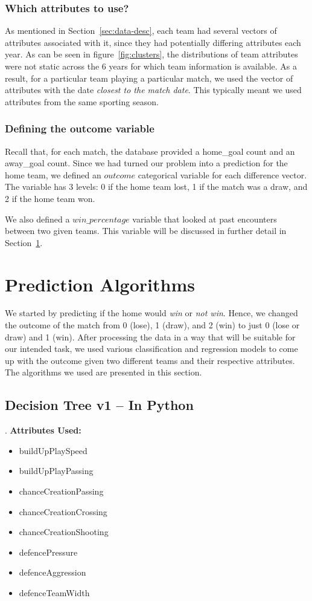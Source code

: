 \documentclass[11pt]{article}
\begin{document}
\subsubsection{Which attributes to use?}
As mentioned in Section~\ref{sec:data-desc}, each team had several vectors of attributes associated with it, since they had potentially differing attributes each year.
As can be seen in figure~\ref{fig:clusters}, the distributions of team attributes were not static across the 6 years for which team information is available.
As a result, for a particular team playing a particular match, we used the vector of attributes with the date \textit{closest to the match date}.
This typically meant we used attributes from the same sporting season.

\subsubsection{Defining the outcome variable}
Recall that, for each match, the database provided a home\_goal count and an away\_goal count.
Since we had turned our problem into a prediction for the home team, we defined an $outcome$ categorical variable for each difference vector.
The variable has 3 levels: 0 if the home team lost, 1 if the match was a draw, and 2 if the home team won.

We also defined a $win\_percentage$ variable that looked at past encounters between two given teams.
This variable will be discussed in further detail in Section~\ref{sec:models}.

\section{Prediction Algorithms}
\label{sec:models}
We started by predicting if the home would \textit{win} or \textit{not win}.
Hence, we changed the outcome of the match from 0 (lose), 1 (draw), and 2 (win) to just 0 (lose or draw) and 1 (win).
After processing the data in a way that will be suitable for our intended task, we used various classification and regression models to come up with the outcome given two different teams and their respective attributes.
The algorithms we used are presented in this section.

\subsection{Decision Tree v1 -- In Python}
\label{ssec:dtree1}.
\textbf{Attributes Used:}
\begin{itemize}
  \setlength\itemsep{0em}
  \item buildUpPlaySpeed
  \item buildUpPlayPassing
  \item chanceCreationPassing
  \item chanceCreationCrossing
  \item chanceCreationShooting
  \item defencePressure
  \item defenceAggression
  \item defenceTeamWidth
\end{itemize}
\end{document}
